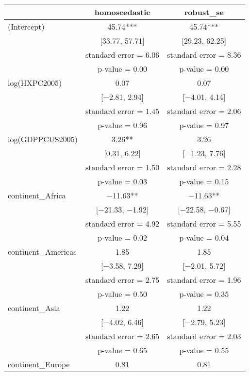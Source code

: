 \documentclass[
]{article}
\begin{document}
\begin{table}
\centering
\begin{tabular}[t]{lcc}
\toprule
  & homoscedastic & robust\_se\\
\midrule
(Intercept) & \num{45.74}*** & \num{45.74}***\\
 & {}[\num{33.77}, \num{57.71}] & {}[\num{29.23}, \num{62.25}]\\
 & standard error = \num{6.06} & standard error = \num{8.36}\\
 & p-value = \num{0.00} & p-value = \num{0.00}\\
log(HXPC2005) & \num{0.07} & \num{0.07}\\
 & {}[\num{-2.81}, \num{2.94}] & {}[\num{-4.01}, \num{4.14}]\\
 & standard error = \num{1.45} & standard error = \num{2.06}\\
 & p-value = \num{0.96} & p-value = \num{0.97}\\
log(GDPPCUS2005) & \num{3.26}** & \num{3.26}\\
 & {}[\num{0.31}, \num{6.22}] & {}[\num{-1.23}, \num{7.76}]\\
 & standard error = \num{1.50} & standard error = \num{2.28}\\
 & p-value = \num{0.03} & p-value = \num{0.15}\\
continent\_Africa & \num{-11.63}** & \num{-11.63}**\\
 & {}[\num{-21.33}, \num{-1.92}] & {}[\num{-22.58}, \num{-0.67}]\\
 & standard error = \num{4.92} & standard error = \num{5.55}\\
 & p-value = \num{0.02} & p-value = \num{0.04}\\
continent\_Americas & \num{1.85} & \num{1.85}\\
 & {}[\num{-3.58}, \num{7.29}] & {}[\num{-2.01}, \num{5.72}]\\
 & standard error = \num{2.75} & standard error = \num{1.96}\\
 & p-value = \num{0.50} & p-value = \num{0.35}\\
continent\_Asia & \num{1.22} & \num{1.22}\\
 & {}[\num{-4.02}, \num{6.46}] & {}[\num{-2.79}, \num{5.23}]\\
 & standard error = \num{2.65} & standard error = \num{2.03}\\
 & p-value = \num{0.65} & p-value = \num{0.55}\\
continent\_Europe & \num{0.81} & \num{0.81}\\

\end{tabular}
\end{table}
\end{document}
